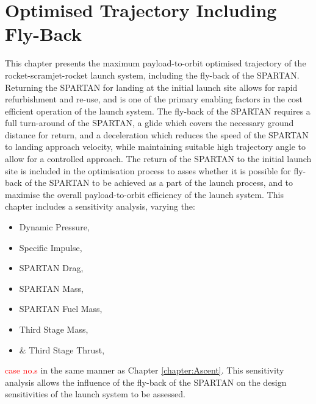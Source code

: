 
\cleardoublepage
\chapter{Optimised Trajectory Including Fly-Back}\label{chapter:Flyback}


This chapter presents the maximum payload-to-orbit optimised trajectory of the rocket-scramjet-rocket launch system, including the fly-back of the SPARTAN. 
 Returning the SPARTAN for landing at the initial launch site allows for rapid refurbishment and re-use, and is one of the primary enabling factors in the cost efficient operation of the launch system. 
The fly-back of the SPARTAN requires a full turn-around of the SPARTAN, a glide which covers the necessary ground distance for return, and a deceleration which reduces the speed of the SPARTAN to landing approach velocity, while maintaining suitable high trajectory angle to allow for a controlled approach. 
The return of the SPARTAN to the initial launch site is included in the optimisation process to asses whether it is possible for fly-back of the SPARTAN to be achieved as a part of the launch process, and to maximise the overall payload-to-orbit efficiency of the launch system. 
This chapter includes a sensitivity analysis, varying the:
 \begin{itemize}
	\item Dynamic Pressure,
	\item Specific Impulse,
	\item SPARTAN Drag,
	\item SPARTAN Mass,
	\item SPARTAN Fuel Mass,
	\item Third Stage Mass,
	\item \& Third Stage Thrust,
\end{itemize}
\textcolor{red}{case no.s}
in the same manner as Chapter \ref{chapter:Ascent}. 
This sensitivity analysis allows the influence of the fly-back of the SPARTAN on the design sensitivities of the launch system to be assessed.


